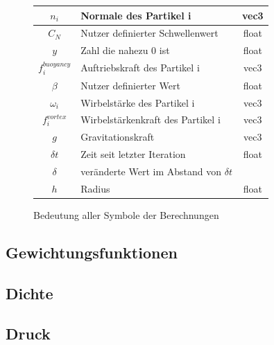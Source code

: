 \documentclass[intern,palatino]{cgBA}
\begin{document}
\begin{figure}
\begin{center}
\begin{tabular}{ | c | p{8cm} | c |}
			$n_i $ 				&  Normale des Partikel i							&	vec3	\\ \hline
			$C_N $ 				&  Nutzer definierter Schwellenwert					&	float	\\ \hline
			$y $ 				&  Zahl die nahezu 0 ist					 		&	float	\\ \hline
			$f^{buoyancy}_i $ 	&  Auftriebskraft des Partikel i					&	vec3	\\ \hline
			$\beta $ 			&  Nutzer definierter Wert							&	float	\\ \hline
			$\omega_i $ 		&  Wirbelstärke des Partikel i						&	vec3	\\ \hline
			$f^{vortex}_i $ 	&  Wirbelstärkenkraft des Partikel i				&	vec3	\\ \hline
			$g $ 				&  Gravitationskraft								&	vec3	\\ \hline
			$\delta t $ 		&  Zeit seit letzter Iteration 						&	float	\\ \hline
			$\delta $ 			&  veränderte Wert im Abstand von $\delta t$ 		&			\\ \hline
			$h $ 				&  Radius											&	float	\\
			\hline
		\end{tabular}
	\end{center}
	\caption{Bedeutung aller Symbole der Berechnungen}
	\label{tab:Symbole}
\end{figure}


\subsection{Gewichtungsfunktionen}


\subsection{Dichte}


\subsection{Druck}

\end{document}
